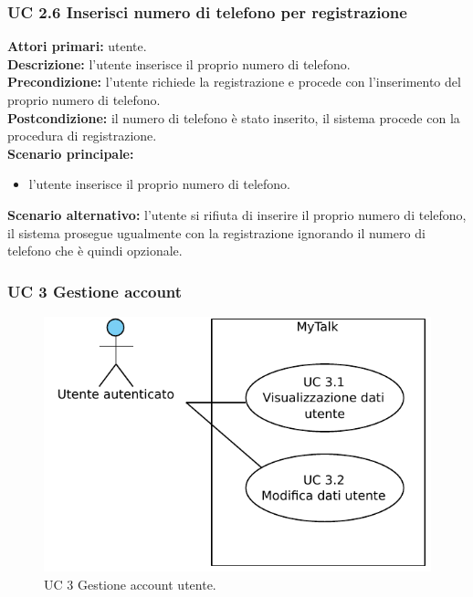 \subsubsection{UC 2.6 Inserisci numero di telefono per registrazione}
\noindent
\textbf{Attori primari:} utente.\\
\textbf{Descrizione:} l'utente inserisce il proprio numero di telefono.\\
\textbf{Precondizione:} l'utente richiede la registrazione e procede con l'inserimento del proprio numero di telefono.\\
\textbf{Postcondizione:} il numero di telefono è stato inserito, il sistema procede con la procedura di registrazione.\\
\textbf{Scenario principale:}
\begin{itemize}
\item l'utente inserisce il proprio numero di telefono.
\end{itemize}
\textbf{Scenario alternativo:} l'utente si rifiuta di inserire il proprio numero di telefono, il sistema prosegue ugualmente con la registrazione ignorando il numero di telefono che è quindi opzionale.\\


\subsubsection{UC 3 Gestione account}

\begin{figure}[htbp]
\centering
\includegraphics[scale=0.7]{./casi_uso/UC3.pdf}
\caption{UC 3 Gestione account utente.}
\end{figure}

